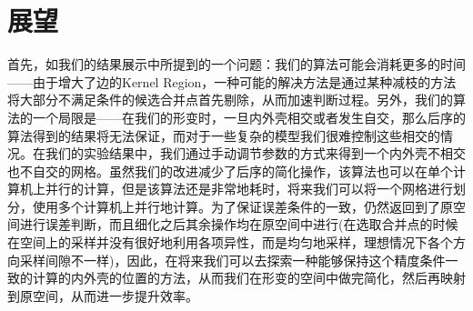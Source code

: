 \section{展望}
首先，如我们的结果展示中所提到的一个问题：我们的算法可能会消耗更多的时间——由于增大了边的Kernel Region，一种可能的解决方法是通过某种减枝的方法将大部分不满足条件的候选合并点首先剔除，从而加速判断过程。另外，我们的算法的一个局限是——在我们的形变时，一旦内外壳相交或者发生自交，那么后序的算法得到的结果将无法保证，而对于一些复杂的模型我们很难控制这些相交的情况。在我们的实验结果中，我们通过手动调节参数的方式来得到一个内外壳不相交也不自交的网格。虽然我们的改进减少了后序的简化操作，该算法也可以在单个计算机上并行的计算，但是该算法还是非常地耗时，将来我们可以将一个网格进行划分，使用多个计算机上并行地计算。为了保证误差条件的一致，仍然返回到了原空间进行误差判断，而且细化之后其余操作均在原空间中进行(在选取合并点的时候在空间上的采样并没有很好地利用各项异性，而是均匀地采样，理想情况下各个方向采样间隙不一样)，因此，在将来我们可以去探索一种能够保持这个精度条件一致的计算的内外壳的位置的方法，从而我们在形变的空间中做完简化，然后再映射到原空间，从而进一步提升效率。
